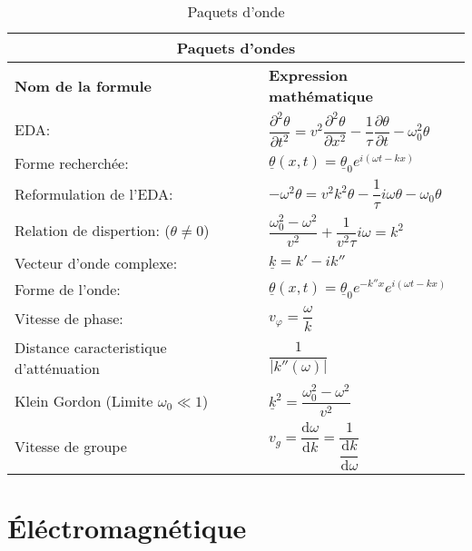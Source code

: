 \documentclass[10pt,a4paper,titlepage,portrait]{article}
\renewcommand{\d}
{
    \mathrm{d}
}
\newcommand*{\dv}[2]
{
    \dfrac{\d#1}{\d#2}
}
\newcommand*{\dpv}[2]
{
    \dfrac{\partial#1}{\partial#2}
}
\newcommand*{\ddpv}[2]
{
    \dfrac{\partial^2#1}{\partial{#2}^2}
}
\renewcommand{\arraystretch}{2}
\begin{document}
\begin{table}[H]
    \centering
    \renewcommand{\arraystretch}{1.5} %
    \setlength{\tabcolsep}{8pt} %
    \begin{tabular}{@{}p{9cm}p{10cm}@{}}
        \toprule
        \multicolumn{2}{c}{\textbf{Paquets d'ondes}} \\
        \midrule
        \textbf{Nom de la formule} & \textbf{Expression mathématique} \\
        \midrule
        EDA: & $\ddpv{\theta}{t}=v^2\ddpv{\theta}{x}-\dfrac{1}{\tau}\dpv{\theta}{t}-\omega_0^2\theta$ \\
        Forme recherchée: & $\underline{\theta}(x,t)=\underline{\theta}_0e^{i(\omega t-kx)}$\\
        Reformulation de l'EDA: & $-\omega^2\theta=v^2k^2\theta-\dfrac{1}{\tau}i\omega\theta-\omega_0\theta$\\
        Relation de dispertion: ($\theta\neq0$) & $\dfrac{\omega_0^2-\omega^2}{v^2}+\dfrac{1}{v^2\tau}i\omega=k^2$\\
        Vecteur d'onde complexe: & $\underline{k}=k'-ik ''$\\
        Forme de l'onde: & $\underline{\theta}(x,t)=\underline{\theta}_0e^{-k''x}e^{i(\omega t-kx)}$\\
        Vitesse de phase: & $v_{\varphi}=\dfrac{\omega}{k}$ \\
        Distance caracteristique d'atténuation & $\dfrac{1}{|k''(\omega)|}$ \\
        Klein Gordon (Limite $\omega_0 \ll 1$) & $\underline{k}^2=\dfrac{\omega_0^2-\omega^2}{v^2}$ \\
        Vitesse de groupe & $v_g=\dv{\omega}{k}=\dfrac{1}{\dv{k}{\omega}}$ \\
    \bottomrule
\end{tabular}
\caption{Paquets d'onde}
\label{tab:packonde}
\end{table}

\section{Éléctromagnétique}
\end{document}
